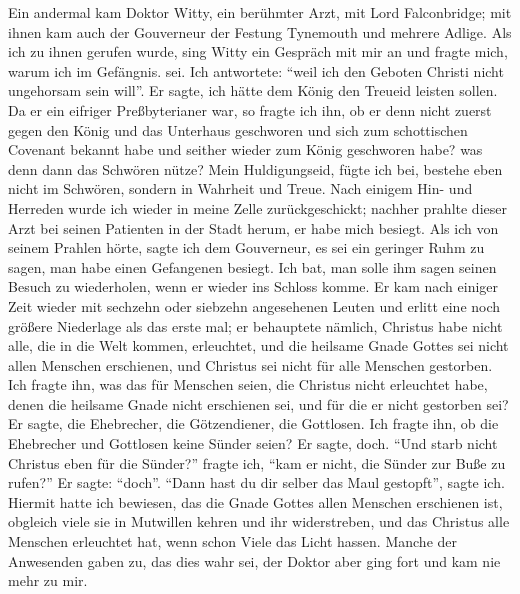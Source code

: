Ein andermal kam Doktor Witty, ein berühmter Arzt, mit
Lord Falconbridge; mit ihnen kam auch der Gouverneur der
Festung Tynemouth und mehrere Adlige. Als ich zu 
ihnen gerufen wurde, sing Witty ein Gespräch mit mir an und fragte mich,
warum ich im Gefängnis. sei. Ich antwortete: "`weil ich den Geboten 
Christi nicht ungehorsam sein will"'. Er sagte, ich hätte
dem König den Treueid leisten sollen. Da er ein eifriger 
Preßbyterianer war, so fragte ich ihn, 
ob er denn nicht zuerst gegen
den König und das Unterhaus geschworen und sich zum
schottischen Covenant bekannt habe und seither wieder zum König
geschworen habe? was denn dann das Schwören nütze? Mein
Huldigungseid, fügte ich bei, bestehe eben nicht im Schwören,
sondern in Wahrheit und Treue. Nach einigem Hin- und Herreden 
wurde ich wieder in meine Zelle zurückgeschickt; nachher
prahlte dieser Arzt bei seinen Patienten in der Stadt herum, er
habe mich besiegt. Als ich von seinem Prahlen hörte, sagte ich
dem Gouverneur, es sei ein geringer Ruhm zu sagen, man habe
einen Gefangenen besiegt. Ich bat, man solle ihm sagen seinen
Besuch zu wiederholen, wenn er wieder ins Schloss komme. Er
kam nach einiger Zeit wieder mit sechzehn oder siebzehn 
angesehenen Leuten und erlitt eine noch größere Niederlage als das
erste mal; er behauptete nämlich, Christus habe nicht alle, die in
die Welt kommen, erleuchtet, und die heilsame Gnade Gottes sei
nicht allen Menschen erschienen, und Christus sei nicht für alle
Menschen gestorben. Ich fragte ihn, was das für Menschen
seien, die Christus nicht erleuchtet habe, denen die heilsame Gnade
nicht erschienen sei, und für die er nicht gestorben sei? Er sagte,
die Ehebrecher, die Götzendiener, die Gottlosen. Ich fragte ihn,
ob die Ehebrecher und Gottlosen keine Sünder seien? Er sagte,
doch. "`Und starb nicht Christus eben für die Sünder?"' fragte ich,
"`kam er nicht, die Sünder zur Buße zu rufen?"' Er sagte: "`doch"'.
"`Dann hast du dir selber das Maul gestopft"', sagte ich. Hiermit
hatte ich bewiesen, das die Gnade Gottes allen Menschen erschienen 
ist, obgleich viele sie in Mutwillen kehren und ihr widerstreben, 
und das Christus alle Menschen erleuchtet hat, wenn
schon Viele das Licht hassen. Manche der Anwesenden gaben zu,
das dies wahr sei, der Doktor aber ging fort und kam nie mehr
zu mir.

